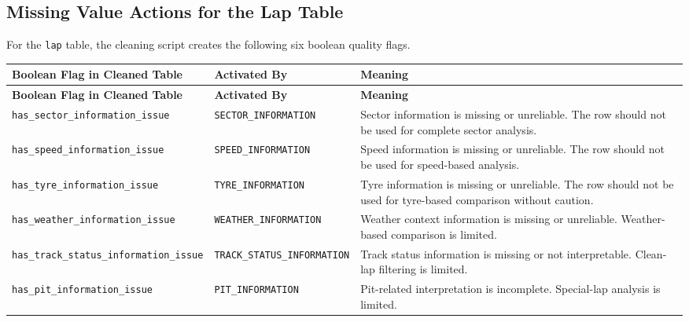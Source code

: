 \documentclass[a4paper,11pt]{article}
\newcommand{\codebreak}[1]{\nolinkurl{#1}}
\begin{document}
	\subsection{Missing Value Actions for the Lap Table}
	
	For the \texttt{lap} table, the cleaning script creates the following six boolean
	quality flags.
	
	\begin{longtable}{p{6cm}p{4cm}p{5cm}}
		\toprule
		\textbf{Boolean Flag in Cleaned Table} & \textbf{Activated By} & \textbf{Meaning} \\
		\midrule
		\endfirsthead
		
		\toprule
		\textbf{Boolean Flag in Cleaned Table} & \textbf{Activated By} & \textbf{Meaning} \\
		\midrule
		\endhead
		
		\codebreak{has_sector_information_issue}
		& \codebreak{SECTOR_INFORMATION}
		& Sector information is missing or unreliable. The row should not be used for complete sector analysis. \\
		\midrule
		
		\codebreak{has_speed_information_issue}
		& \codebreak{SPEED_INFORMATION}
		& Speed information is missing or unreliable. The row should not be used for speed-based analysis. \\
		\midrule
		
		\codebreak{has_tyre_information_issue}
		& \codebreak{TYRE_INFORMATION}
		& Tyre information is missing or unreliable. The row should not be used for tyre-based comparison without caution. \\
		\midrule
		
		\codebreak{has_weather_information_issue}
		& \codebreak{WEATHER_INFORMATION}
		& Weather context information is missing or unreliable. Weather-based comparison is limited. \\
		\midrule
		
		\codebreak{has_track_status_information_issue}
		& \codebreak{TRACK_STATUS_INFORMATION}
		& Track status information is missing or not interpretable. Clean-lap filtering is limited. \\
		\midrule
		
		\codebreak{has_pit_information_issue}
		& \codebreak{PIT_INFORMATION}
		& Pit-related interpretation is incomplete. Special-lap analysis is limited. \\
		\bottomrule
	\end{longtable}
	
\end{document}
